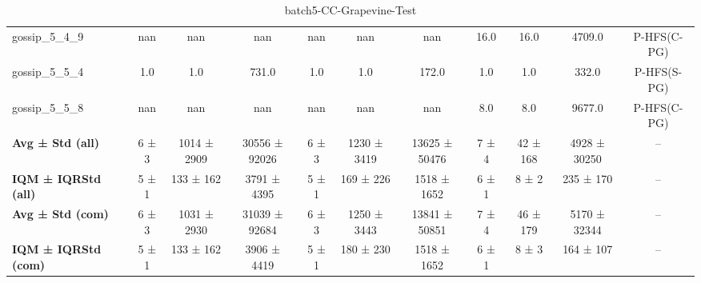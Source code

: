 \begin{table}[!ht]
\begin{tabular}{l|ccc|ccc|cccc}
gossip\_5\_4\_9 & nan & nan & nan & nan & nan & nan & 16.0 & 16.0 & 4709.0 & P-HFS(C-PG) \\
gossip\_5\_5\_4 & 1.0 & 1.0 & 731.0 & 1.0 & 1.0 & 172.0 & 1.0 & 1.0 & 332.0 & P-HFS(S-PG) \\
gossip\_5\_5\_8 & nan & nan & nan & nan & nan & nan & 8.0 & 8.0 & 9677.0 & P-HFS(C-PG) \\
\hline
\textbf{Avg ± Std (all)} & 6 ± 3 & 1014 ± 2909 & 30556 ± 92026 & 6 ± 3 & 1230 ± 3419 & 13625 ± 50476 & 7 ± 4 & 42 ± 168 & 4928 ± 30250 & -- \\
\textbf{IQM ± IQRStd (all)} & 5 ± 1 & 133 ± 162 & 3791 ± 4395 & 5 ± 1 & 169 ± 226 & 1518 ± 1652 & 6 ± 1 & 8 ± 2 & 235 ± 170 & -- \\
\textbf{Avg ± Std (com)} & 6 ± 3 & 1031 ± 2930 & 31039 ± 92684 & 6 ± 3 & 1250 ± 3443 & 13841 ± 50851 & 7 ± 4 & 46 ± 179 & 5170 ± 32344 & -- \\
\textbf{IQM ± IQRStd (com)} & 5 ± 1 & 133 ± 162 & 3906 ± 4419 & 5 ± 1 & 180 ± 230 & 1518 ± 1652 & 6 ± 1 & 8 ± 3 & 164 ± 107 & -- \\
\end{tabular}
\caption{batch5-CC-Grapevine-Test}
\label{tab:batch5_CC-Grapevine_comparison_test}
\end{table}

